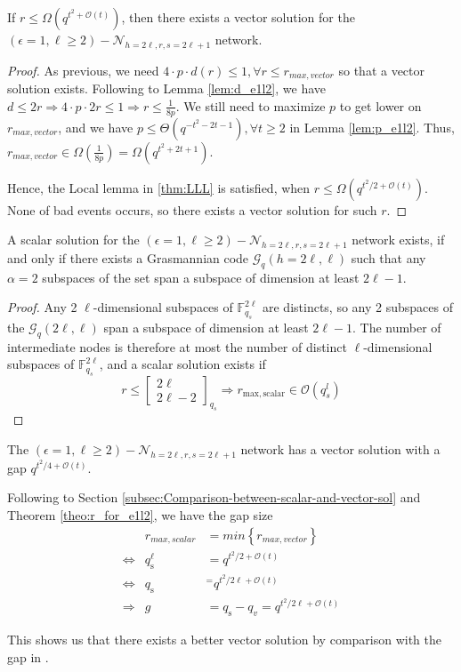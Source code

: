 \begin{thm}
If $r\leq\Omega\left(q^{t^{2}+\mathcal{O}\left(t\right)}\right)$,
then there exists a vector solution for the $\left(\epsilon=1,\ell\geq2\right)-\mathcal{N}_{h=2\ell,r,s=2\ell+1}$
network. \label{theo:r_for_e1l2}
\end{thm}
\begin{proof}
As previous, we need $4\cdot p\cdot d(r)\leq1,\forall r\leq r_{max,vector}$
so that a vector solution exists. Following to Lemma \ref{lem:d_e1l2},
we have $d\leq2r\Rightarrow4\cdot p\cdot2r\leq1\Rightarrow r\leq\frac{1}{8p}$.
We still need to maximize $p$ to get lower on $r_{max,vector}$,
and we have $p\leq\Theta\left(q^{-t^{2}-2t-1}\right),\forall t\geq2$
in Lemma \ref{lem:p_e1l2}. Thus, $r_{max,vector}\in\Omega\left(\frac{1}{8p}\right)=\Omega\left(q^{t^{2}+2t+1}\right)$.

Hence, the Local lemma in \ref{thm:LLL} is satisfied, when $r\leq\Omega\left(q^{t^{2}/2+\mathcal{O}\left(t\right)}\right)$.
None of bad events occurs, so there exists a vector solution for such
$r$.
\end{proof}
\begin{lem}
A scalar solution for the $\left(\epsilon=1,\ell\geq2\right)-\mathcal{N}_{h=2\ell,r,s=2\ell+1}$
network exists, if and only if there exists a Grasmannian code $\mathcal{G}_{q}\left(h=2\ell,\ell\right)$
such that any $\alpha=2$ subspaces of the set span a subspace of
dimension at least $2\ell-1$. 
\end{lem}
\begin{proof}
Any 2 $\ell$-dimensional subspaces of $\ensuremath{\mathbb{F}}_{q_{s}}^{2\ell}$
are distincts, so any 2 subspaces of the $\mathcal{G}_{q}\left(2\ell,\ell\right)$
span a subspace of dimension at least $2\ell-1$. The number of intermediate
nodes is therefore at most the number of distinct $\ell$-dimensional
subspaces of $\ensuremath{\mathbb{F}}_{q_{s}}^{2\ell}$, and a scalar
solution exists if
\[
r\leq\left[\begin{array}{c}
2\ell\\
2\ell-2
\end{array}\right]_{q_{s}}\Rightarrow r_{\mathrm{max,scalar}}\in\mathcal{O}\left(q_{s}^{l}\right)
\]
\end{proof}
\begin{cor}
The $\left(\epsilon=1,\ell\geq2\right)-\mathcal{N}_{h=2\ell,r,s=2\ell+1}$
network has a vector solution with a gap $q^{t^{2}/4+\mathcal{O}(t)}$.
\end{cor}
Following to Section \ref{subsec:Comparison-between-scalar-and-vector-sol}
and Theorem \ref{theo:r_for_e1l2}, we have the gap size 
\begin{eqnarray}
 & r_{max,scalar} & =min\left\{ r_{max,vector}\right\} \nonumber \\
\Leftrightarrow & q_{\mathrm{s}}^{\ell} & =q^{t^{2}/2+\mathcal{O}(t)}\nonumber \\
\Leftrightarrow & q_{\mathrm{s}} & ^{=}q^{t^{2}/2\ell+\mathcal{O}(t)}\nonumber \\
\Rightarrow & g & =q_{\mathrm{s}}-q_{v}=q^{t^{2}/2\ell+\mathcal{O}(t)}\label{eq:gap_e1l2}
\end{eqnarray}

This shows us that there exists a better vector solution by comparison
with the gap in \cite[Fig. 4]{Wachter-Zeh:2018}.

\clearpage